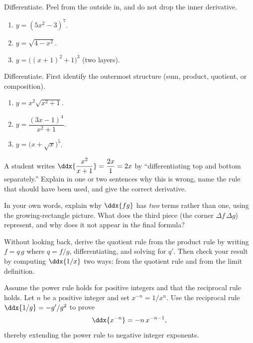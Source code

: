 \begin{exercise}
Differentiate. Peel from the outside in, and do not drop the inner derivative.
\begin{enumerate}
  \item $y = (5x^2 - 3)^{7}$.
  \item $y = \sqrt{4 - x^2}$.
  \item $y = \big((x+1)^2 + 1\big)^{3}$ \;(two layers).
\end{enumerate}
\end{exercise}

\begin{exercise}
Differentiate. First identify the outermost structure (sum, product, quotient, or
composition).
\begin{enumerate}
  \item $y = x^2\sqrt{x^2+1}$.
  \item $y = \dfrac{(3x-1)^4}{x^2+1}$.
  \item $y = \big(x + \sqrt{x}\big)^5$.
\end{enumerate}
\end{exercise}

\begin{exercise}
A student writes $\ddx{\dfrac{x^2}{x+1}} = \dfrac{2x}{1} = 2x$ by ``differentiating top and
bottom separately.'' Explain in one or two sentences why this is wrong, name the rule that
should have been used, and give the correct derivative.
\end{exercise}

\begin{exercise}
In your own words, explain why $\ddx{fg}$ has \emph{two} terms rather than one, using the
growing-rectangle picture. What does the third piece (the corner $\Delta f\,\Delta g$)
represent, and why does it not appear in the final formula?
\end{exercise}

\begin{exercise}
Without looking back, derive the quotient rule from the product rule by writing
$f = q\,g$ where $q = f/g$, differentiating, and solving for $q'$. Then check your result
by computing $\ddx{1/x}$ two ways: from the quotient rule and from the limit definition.
\end{exercise}

\begin{exercise}
Assume the power rule holds for positive integers and that the reciprocal rule holds. Let
$n$ be a positive integer and set $x^{-n} = 1/x^{n}$. Use the reciprocal rule
$\ddx{1/g} = -g'/g^2$ to prove
\[
  \ddx{x^{-n}} = -n\,x^{-n-1},
\]
thereby extending the power rule to negative integer exponents.
\end{exercise}

